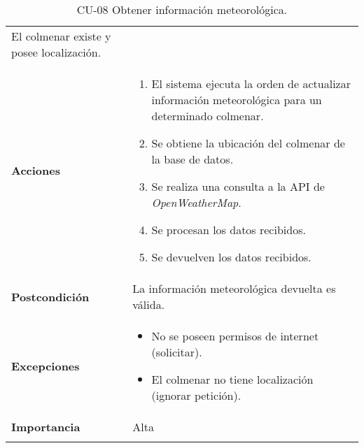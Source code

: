 \begin{longtable}[H]{@{}ll@{}}
\begin{minipage}[t]{0.74\columnwidth}
El colmenar existe y posee localización.\strut
\end{minipage}\tabularnewline
\begin{minipage}[t]{0.20\columnwidth}\raggedright\strut
\textbf{Acciones}\strut
\end{minipage} & \begin{minipage}[t]{0.74\columnwidth}\raggedright\strut
\begin{enumerate}
\def\labelenumi{\arabic{enumi}.}
\tightlist
\item
  El sistema ejecuta la orden de actualizar información meteorológica
  para un determinado colmenar.
\item
  Se obtiene la ubicación del colmenar de la base de datos.
\item
  Se realiza una consulta a la API de \emph{OpenWeatherMap}.
\item
  Se procesan los datos recibidos.
\item
  Se devuelven los datos recibidos.
\end{enumerate}\strut
\end{minipage}\tabularnewline
\begin{minipage}[t]{0.20\columnwidth}\raggedright\strut
\textbf{Postcondición}\strut
\end{minipage} & \begin{minipage}[t]{0.74\columnwidth}\raggedright\strut
La información meteorológica devuelta es válida.\strut
\end{minipage}\tabularnewline
\begin{minipage}[t]{0.20\columnwidth}\raggedright\strut
\textbf{Excepciones}\strut
\end{minipage} & \begin{minipage}[t]{0.74\columnwidth}\raggedright\strut
\begin{itemize}
\tightlist
\item
  No se poseen permisos de internet (solicitar).
\item
  El colmenar no tiene localización (ignorar petición).
\end{itemize}\strut
\end{minipage}\tabularnewline
\begin{minipage}[t]{0.20\columnwidth}\raggedright\strut
\textbf{Importancia}\strut
\end{minipage} & \begin{minipage}[t]{0.74\columnwidth}\raggedright\strut
Alta\strut
\end{minipage}\tabularnewline
\bottomrule
\caption{CU-08 Obtener información meteorológica.}
\end{longtable}

